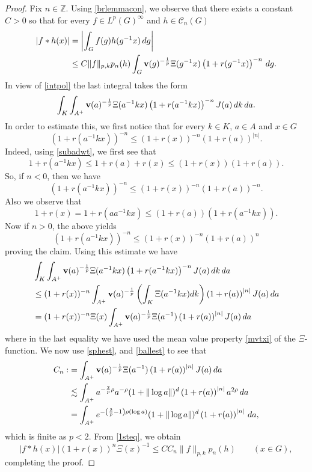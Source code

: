 \documentclass[10pt,a4paper]{amsart}
\begin{document}
\begin{proof}
Fix $n \in \mathbb{Z}$. Using \eqref{brlemmacon}, we observe that there exists a constant $C>0$ so that for every $f\in L^{p}(G)^{\infty}$ and $h\in \mathcal{C}_{n}(G)$
\begin{align}\label{1steq}
	\nonumber
    |f\ast h(x)|&=\left|\int_G f(g)h(g^{-1}x)\,dg\right|\\
	&\leq C\|f\|_{p,k}p_n(h)\int_{G} {\bf{v}}(g)^{-\frac1p}\Xi(g^{-1}x)\left(1+r(g^{-1}x)\right)^{-n}\,dg.
\end{align}
In view of \eqref{intpol} the last integral takes the form
\begin{align*}
	\int_{K}\int_{A^+}{\bf{v}}(a)^{-\frac1p}\Xi(a^{-1}kx)\left(1+r(a^{-1}kx)\right)^{-n} J(a)\,dk\,da.
\end{align*}
In order to estimate this, we first notice that for every $k\in K$, $a\in A$ and $x\in G$
$$
\left(1+r(a^{-1}kx)\right)^{-n}\leq (1+r(x))^{-n}(1+r(a))^{|n|}.
$$
Indeed, using \eqref{subadwt}, we first see that
$$
1+r(a^{-1}kx)
\leq 1+r(a)+r(x)\leq (1+r(x))(1+r(a)).
$$
So, if $n<0$, then we have
$$
(1+r(a^{-1}kx))^{-n}
\leq (1+r(x))^{-n}(1+r(a))^{-n}.
$$
Also we observe that
$$
1+r(x)
=1+r(aa^{-1}kx)
\leq (1+r(a))(1+r(a^{-1}kx)).
$$
Now if $n>0$, the above  yields
$$
(1+r(a^{-1}kx))^{-n}
\leq {(1+r(x))^{-n}}{(1+r(a))^{n}}
$$
proving the claim. Using this estimate we have
\begin{align*}
	&\int_{K}\int_{A^+}{\bf{v}}(a)^{-\frac1p}\Xi(a^{-1}kx)\left(1+r(a^{-1}kx)\right)^{-n} J(a)\,dk\,da\\
    &\leq (1+r(x))^{-n} \int_{A^+}{\bf{v}}(a)^{-\frac1p}\left(\int_{K}\Xi(a^{-1}kx)dk\right)\left(1+r(a)\right)^{|n|} J(a)\,da\\
	&=(1+r(x))^{-n}\Xi(x) \int_{A^+}{\bf{v}}(a)^{-\frac1p}\Xi(a^{-1})\left(1+r(a)\right)^{|n|} J(a)\,da
\end{align*}
where in the last equality we have used the mean value property
\eqref{mvtxi}  of the $\Xi$-function. We now use \eqref{sphest}, and \eqref{ballest} to see that
\begin{align*}
C_n:&=\int_{A^+}{\bf{v}}(a)^{-\frac1p}\Xi(a^{-1})\left(1+r(a)\right)^{|n|} J(a)\,da\\
&\lesssim \int_{A^+}a^{-\frac2p\rho}a^{-\rho}(1+\|\log a\|)^d\left(1+r(a)\right)^{|n|} a^{2\rho}\,da\\
&= \int_{A^+} e^{-\left(\frac2p-1\right)\rho(\log a)}(1+\|\log a\|)^d\left(1+r(a)\right)^{|n|}\,da,
\end{align*} which is finite as $p<2$. From \eqref{1steq}, we obtain
$$
|f\ast h(x)|(1+r(x))^{n}\Xi(x)^{-1}
\leq CC_n \|f\|_{p,k}p_n(h)\qquad (x\in G),
$$
completing the proof.
\end{proof}
\end{document}
